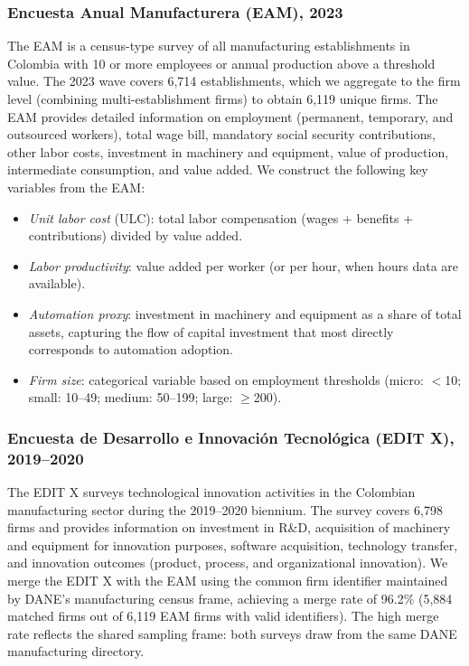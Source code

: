 \documentclass{article}
\begin{document}
\subsubsection*{Encuesta Anual Manufacturera (EAM), 2023}

The EAM is a census-type survey of all manufacturing establishments in Colombia with 10 or more employees or annual production above a threshold value. The 2023 wave covers 6,714 establishments, which we aggregate to the firm level (combining multi-establishment firms) to obtain 6,119 unique firms. The EAM provides detailed information on employment (permanent, temporary, and outsourced workers), total wage bill, mandatory social security contributions, other labor costs, investment in machinery and equipment, value of production, intermediate consumption, and value added. We construct the following key variables from the EAM:

\begin{itemize}[nosep]
\item \textit{Unit labor cost} (ULC): total labor compensation (wages + benefits + contributions) divided by value added.
\item \textit{Labor productivity}: value added per worker (or per hour, when hours data are available).
\item \textit{Automation proxy}: investment in machinery and equipment as a share of total assets, capturing the flow of capital investment that most directly corresponds to automation adoption.
\item \textit{Firm size}: categorical variable based on employment thresholds (micro: $<$10; small: 10--49; medium: 50--199; large: $\geq$200).
\end{itemize}

\subsubsection*{Encuesta de Desarrollo e Innovaci\'on Tecnol\'ogica (EDIT X), 2019--2020}

The EDIT X surveys technological innovation activities in the Colombian manufacturing sector during the 2019--2020 biennium. The survey covers 6,798 firms and provides information on investment in R\&D, acquisition of machinery and equipment for innovation purposes, software acquisition, technology transfer, and innovation outcomes (product, process, and organizational innovation). We merge the EDIT X with the EAM using the common firm identifier maintained by DANE's manufacturing census frame, achieving a merge rate of 96.2\% (5,884 matched firms out of 6,119 EAM firms with valid identifiers). The high merge rate reflects the shared sampling frame: both surveys draw from the same DANE manufacturing directory.
\end{document}
